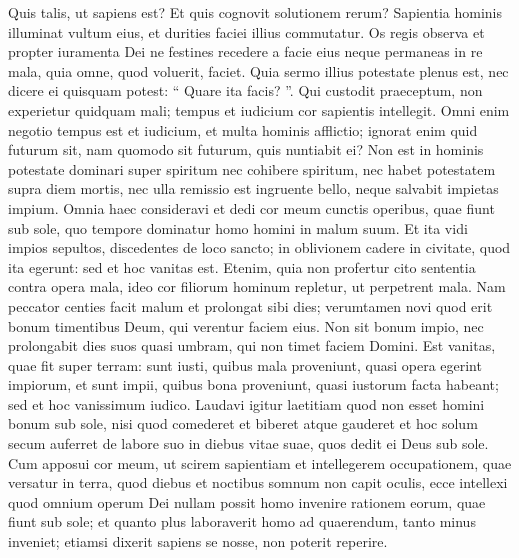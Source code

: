 \begin{biblechapter}
\begin{biblechapter}
\begin{biblechapter}
\begin{biblechapter}
\begin{biblechapter}
\begin{biblechapter}
\begin{biblechapter}
\begin{biblechapter}
\verse Quis talis, ut sapiens est?
 Et quis cognovit solutionem rerum?
 Sapientia hominis illuminat vultum eius,
 et durities faciei illius commutatur.
 \verse Os regis observa et propter iuramenta Dei 
\verse ne festines recedere a facie eius neque permaneas in re mala, quia omne, quod voluerit, faciet. 
\verse Quia sermo illius potestate plenus est, nec dicere ei quisquam potest: “ Quare ita facis? ”. 
\verse Qui custodit praeceptum, non experietur quidquam mali; tempus et iudicium cor sapientis intellegit. 
\verse Omni enim negotio tempus est et iudicium, et multa hominis afflictio; 
\verse ignorat enim quid futurum sit, nam quomodo sit futurum, quis nuntiabit ei? 
\verse Non est in hominis potestate dominari super spiritum nec cohibere spiritum, nec habet potestatem supra diem mortis, nec ulla remissio est ingruente bello, neque salvabit impietas impium.
 \verse Omnia haec consideravi et dedi cor meum cunctis operibus, quae fiunt sub sole, quo tempore dominatur homo homini in malum suum. 
\verse Et ita vidi impios sepultos, discedentes de loco sancto; in oblivionem cadere in civitate, quod ita egerunt: sed et hoc vanitas est. 
\verse Etenim, quia non profertur cito sententia contra opera mala, ideo cor filiorum hominum repletur, ut perpetrent mala. 
\verse Nam peccator centies facit malum et prolongat sibi dies; verumtamen novi quod erit bonum timentibus Deum, qui verentur faciem eius. 
\verse Non sit bonum impio, nec prolongabit dies suos quasi umbram, qui non timet faciem Domini. 
\verse Est vanitas, quae fit super terram: sunt iusti, quibus mala proveniunt, quasi opera egerint impiorum, et sunt impii, quibus bona proveniunt, quasi iustorum facta habeant; sed et hoc vanissimum iudico. 
\verse Laudavi igitur laetitiam quod non esset homini bonum sub sole, nisi quod comederet et biberet atque gauderet et hoc solum secum auferret de labore suo in diebus vitae suae, quos dedit ei Deus sub sole. 
\verse Cum apposui cor meum, ut scirem sapientiam et intellegerem occupationem, quae versatur in terra, quod diebus et noctibus somnum non capit oculis, 
\verse ecce intellexi quod omnium operum Dei nullam possit homo invenire rationem eorum, quae fiunt sub sole; et quanto plus laboraverit homo ad quaerendum, tanto minus inveniet; etiamsi dixerit sapiens se nosse, non poterit reperire.
 

\end{biblechapter}
\end{biblechapter}
\end{biblechapter}
\end{biblechapter}
\end{biblechapter}
\end{biblechapter}
\end{biblechapter}
\end{biblechapter}
